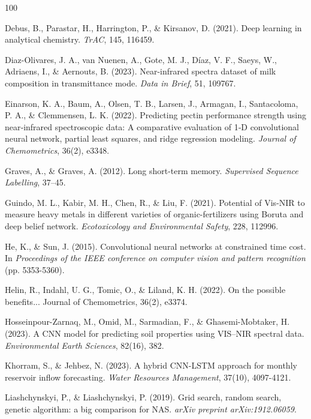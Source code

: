 \documentclass[10pt, a4paper, oneside]{article}
\begin{document}
\begin{thebibliography}{100}
{Debus, B., Parastar, H., Harrington, P., \& Kirsanov, D. (2021). Deep learning in analytical chemistry. \textit{TrAC}, 145, 116459.

 Diaz-Olivares, J. A., van Nuenen, A., Gote, M. J., Díaz, V. F., Saeys, W., Adriaens, I., \& Aernouts, B. (2023). Near-infrared spectra dataset of milk composition in transmittance mode. \textit{Data in Brief}, 51, 109767.

 Einarson, K. A., Baum, A., Olsen, T. B., Larsen, J., Armagan, I., Santacoloma, P. A., \& Clemmensen, L. K. (2022). Predicting pectin performance strength using near‐infrared spectroscopic data: A comparative evaluation of 1‐D convolutional neural network, partial least squares, and ridge regression modeling. \textit{Journal of Chemometrics}, 36(2), e3348.

 Graves, A., \& Graves, A. (2012). Long short-term memory. \textit{Supervised Sequence Labelling}, 37–45.

 Guindo, M. L., Kabir, M. H., Chen, R., \& Liu, F. (2021). Potential of Vis-NIR to measure heavy metals in different varieties of organic-fertilizers using Boruta and deep belief network. \textit{Ecotoxicology and Environmental Safety}, 228, 112996.

 He, K., \& Sun, J. (2015). Convolutional neural networks at constrained time cost. In \textit{Proceedings of the IEEE conference on computer vision and pattern recognition} (pp. 5353-5360).

 Helin, R., Indahl, U. G., Tomic, O., \& Liland, K. H. (2022). On the possible benefits... Journal of Chemometrics, 36(2), e3374.

 Hosseinpour-Zarnaq, M., Omid, M., Sarmadian, F., \& Ghasemi-Mobtaker, H. (2023). A CNN model for predicting soil properties using VIS–NIR spectral data. \textit{Environmental Earth Sciences}, 82(16), 382.

 Khorram, S., \& Jehbez, N. (2023). A hybrid CNN-LSTM approach for monthly reservoir inflow forecasting. \textit{Water Resources Management}, 37(10), 4097-4121.

Liashchynskyi, P., \& Liashchynskyi, P. (2019). Grid search, random search, genetic algorithm: a big comparison for NAS. \textit{arXiv preprint arXiv:1912.06059}.

}
\end{thebibliography}
\end{document}
